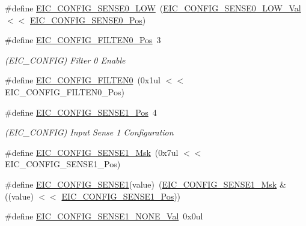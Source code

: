 \begin{DoxyCompactItemize}
\#define \mbox{\hyperlink{group___s_a_m_d21___e_i_c_ga932e047ca4b45c95903a2e575fe0bcd4}{E\+I\+C\+\_\+\+C\+O\+N\+F\+I\+G\+\_\+\+S\+E\+N\+S\+E0\+\_\+\+L\+OW}}~(\mbox{\hyperlink{group___s_a_m_d21___e_i_c_gad578c3896d5b3cdc4631cba1a6f3f8e2}{E\+I\+C\+\_\+\+C\+O\+N\+F\+I\+G\+\_\+\+S\+E\+N\+S\+E0\+\_\+\+L\+O\+W\+\_\+\+Val}}     $<$$<$ \mbox{\hyperlink{group___s_a_m_d21___e_i_c_ga9a191a13be42b2e0283c890d9302f461}{E\+I\+C\+\_\+\+C\+O\+N\+F\+I\+G\+\_\+\+S\+E\+N\+S\+E0\+\_\+\+Pos}})
\item 
\#define \mbox{\hyperlink{group___s_a_m_d21___e_i_c_gaa17527a9aab80477ff20ed73d2d7177a}{E\+I\+C\+\_\+\+C\+O\+N\+F\+I\+G\+\_\+\+F\+I\+L\+T\+E\+N0\+\_\+\+Pos}}~3
\begin{DoxyCompactList}\small\item\em (E\+I\+C\+\_\+\+C\+O\+N\+F\+IG) Filter 0 Enable \end{DoxyCompactList}\item 
\#define \mbox{\hyperlink{group___s_a_m_d21___e_i_c_gaf3dda3c75f2f02a4d4c532526cc29230}{E\+I\+C\+\_\+\+C\+O\+N\+F\+I\+G\+\_\+\+F\+I\+L\+T\+E\+N0}}~(0x1ul $<$$<$ E\+I\+C\+\_\+\+C\+O\+N\+F\+I\+G\+\_\+\+F\+I\+L\+T\+E\+N0\+\_\+\+Pos)
\item 
\#define \mbox{\hyperlink{group___s_a_m_d21___e_i_c_gab34794f88d0b20fa2792afe7fecd7fc1}{E\+I\+C\+\_\+\+C\+O\+N\+F\+I\+G\+\_\+\+S\+E\+N\+S\+E1\+\_\+\+Pos}}~4
\begin{DoxyCompactList}\small\item\em (E\+I\+C\+\_\+\+C\+O\+N\+F\+IG) Input Sense 1 Configuration \end{DoxyCompactList}\item 
\#define \mbox{\hyperlink{group___s_a_m_d21___e_i_c_ga77aa5f88d3ea77e93becbd87eec2ffde}{E\+I\+C\+\_\+\+C\+O\+N\+F\+I\+G\+\_\+\+S\+E\+N\+S\+E1\+\_\+\+Msk}}~(0x7ul $<$$<$ E\+I\+C\+\_\+\+C\+O\+N\+F\+I\+G\+\_\+\+S\+E\+N\+S\+E1\+\_\+\+Pos)
\item 
\#define \mbox{\hyperlink{group___s_a_m_d21___e_i_c_ga1ce58639b6e0135e1061584726b1c705}{E\+I\+C\+\_\+\+C\+O\+N\+F\+I\+G\+\_\+\+S\+E\+N\+S\+E1}}(value)~(\mbox{\hyperlink{group___s_a_m_d21___e_i_c_ga77aa5f88d3ea77e93becbd87eec2ffde}{E\+I\+C\+\_\+\+C\+O\+N\+F\+I\+G\+\_\+\+S\+E\+N\+S\+E1\+\_\+\+Msk}} \& ((value) $<$$<$ \mbox{\hyperlink{group___s_a_m_d21___e_i_c_gab34794f88d0b20fa2792afe7fecd7fc1}{E\+I\+C\+\_\+\+C\+O\+N\+F\+I\+G\+\_\+\+S\+E\+N\+S\+E1\+\_\+\+Pos}}))
\item 
\#define \mbox{\hyperlink{group___s_a_m_d21___e_i_c_ga2dd12fe5d69cac11eb3b807a1ba2972a}{E\+I\+C\+\_\+\+C\+O\+N\+F\+I\+G\+\_\+\+S\+E\+N\+S\+E1\+\_\+\+N\+O\+N\+E\+\_\+\+Val}}~0x0ul

\end{DoxyCompactItemize}
